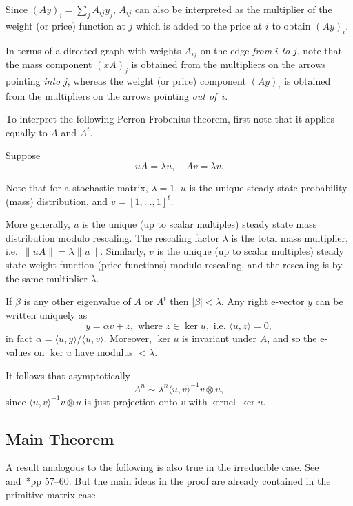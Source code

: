 \documentclass[a4paper]{amsart}
\theoremstyle{plain}
\theoremstyle{definition}
\theoremstyle{remark}
\begin{document}
Since  $ (Ay)_i = \sum_jA_{ij}y_j $,   $ A_{ij} $ can also be interpreted as  the multiplier of the weight (or price) function at $ j $ which is added to the price at $ i $ to obtain $ (Ay)_i  $.

\medskip
In terms of a directed graph with weights $ A_{ij} $ on the edge \emph{from} $ i $ \emph{to} $ j $, note  that the mass component $ (x A)_j$ is obtained from the multipliers   on the arrows pointing \emph{into} $ j $, whereas the weight (or price) component $ (Ay)_i $ is obtained from the multipliers on the arrows pointing \emph{out of}~$ i $.

\medskip  To interpret the following Perron Frobenius theorem, first note that it applies equally to $ A $ and $ A^t $.

Suppose 
\[
 uA = \lambda u, \quad  Av= \lambda v  .
 \]

Note that for a stochastic matrix, $ \lambda = 1 $, $ u $ is the unique steady state probability (mass) distribution, and $ v = [1,\dots, 1]^t $.  

More generally, $u $ is the unique (up to  scalar multiples) steady state mass distribution modulo rescaling.  The rescaling factor $ \lambda$ is the   total mass multiplier, i.e.\  $ \|uA\| = \lambda \|u\|$.
Similarly, $ v $ is the unique (up to scalar multiples) steady state weight function (price functions) modulo rescaling, and the rescaling is by the same multiplier $ \lambda $.

If $ \beta $  is any other eigenvalue of $ A$ or $ A^t $ then $ | \beta | < \lambda $.   Any right e-vector $ y $ can be written uniquely as  
\[
y =\alpha v + z , \text{ where } z \in \ker u, \text{ i.e.\ } \langle u,z \rangle = 0,
\]
in fact $ \alpha = \langle u,y \rangle / \langle u,v \rangle $.  Moreover, $ \ker u $ is invariant under $ A $, and so the e-values on $ \ker u$ have modulus $ < \lambda $.

It follows that asymptotically
\[ 
A^n \sim \lambda ^n \langle u,v \rangle ^{-1}v \otimes u ,
\]
since $  \langle u,v \rangle ^{-1}v \otimes u $ is just projection onto $ v $ with kernel $ \ker u $.

\subsection{Main Theorem}
 

 A result analogous to the following is also true in the irreducible case.  See \cite{Boy} and~\cite{ Bri}*{pp 57--60}.  But the main ideas in the proof are already contained in the primitive matrix case.
\end{document}
